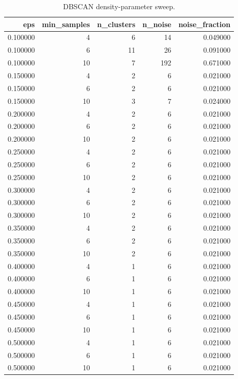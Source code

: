 \begin{table}
\caption{DBSCAN density-parameter sweep.}
\label{tab:dbscan:sweep}
\begin{tabular}{rrrrr}
\toprule
eps & min_samples & n_clusters & n_noise & noise_fraction \\
\midrule
0.100000 & 4 & 6 & 14 & 0.049000 \\
0.100000 & 6 & 11 & 26 & 0.091000 \\
0.100000 & 10 & 7 & 192 & 0.671000 \\
0.150000 & 4 & 2 & 6 & 0.021000 \\
0.150000 & 6 & 2 & 6 & 0.021000 \\
0.150000 & 10 & 3 & 7 & 0.024000 \\
0.200000 & 4 & 2 & 6 & 0.021000 \\
0.200000 & 6 & 2 & 6 & 0.021000 \\
0.200000 & 10 & 2 & 6 & 0.021000 \\
0.250000 & 4 & 2 & 6 & 0.021000 \\
0.250000 & 6 & 2 & 6 & 0.021000 \\
0.250000 & 10 & 2 & 6 & 0.021000 \\
0.300000 & 4 & 2 & 6 & 0.021000 \\
0.300000 & 6 & 2 & 6 & 0.021000 \\
0.300000 & 10 & 2 & 6 & 0.021000 \\
0.350000 & 4 & 2 & 6 & 0.021000 \\
0.350000 & 6 & 2 & 6 & 0.021000 \\
0.350000 & 10 & 2 & 6 & 0.021000 \\
0.400000 & 4 & 1 & 6 & 0.021000 \\
0.400000 & 6 & 1 & 6 & 0.021000 \\
0.400000 & 10 & 1 & 6 & 0.021000 \\
0.450000 & 4 & 1 & 6 & 0.021000 \\
0.450000 & 6 & 1 & 6 & 0.021000 \\
0.450000 & 10 & 1 & 6 & 0.021000 \\
0.500000 & 4 & 1 & 6 & 0.021000 \\
0.500000 & 6 & 1 & 6 & 0.021000 \\
0.500000 & 10 & 1 & 6 & 0.021000 \\
\bottomrule
\end{tabular}
\end{table}
